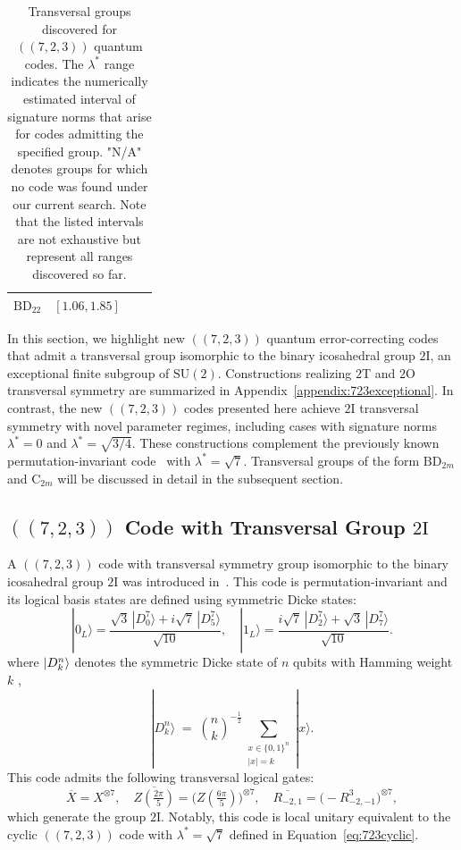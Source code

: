 \documentclass[8pt]{article}
\theoremstyle{definition}
\begin{document}
\begin{table}[h!]
\begin{tabular}{c | c || c | c}
        \(\mathrm{BD}_{22}\) & \([1.06, 1.85]\)                                  &                      &                                                                      \\
        \bottomrule
    \end{tabular}
    \caption{Transversal groups discovered for \(((7,2,3))\) quantum codes. The \(\lambda^*\) range indicates the numerically estimated interval of signature norms that arise for codes admitting the specified group. "N/A" denotes groups for which no code was found under our current search. Note that the listed intervals are not exhaustive but represent all ranges discovered so far.}
    \label{table:723-transversal-groups}
\end{table}

In this section, we highlight new \(((7,2,3))\) quantum error-correcting codes that admit a transversal group isomorphic to the binary icosahedral group \(2\mathrm{I}\), an exceptional finite subgroup of \(\mathrm{SU}(2)\). Constructions realizing \(2\mathrm{T}\) and \(2\mathrm{O}\) transversal symmetry are summarized in Appendix~\ref{appendix:723exceptional}. In contrast, the new \(((7,2,3))\) codes presented here achieve \(2\mathrm{I}\) transversal symmetry with novel parameter regimes, including cases with signature norms \(\lambda^* = 0\) and \(\lambda^* = \sqrt{3/4}\). These constructions complement the previously known permutation-invariant code~\cite{pollatsek2004permutationally,kubischta2023family} with \(\lambda^* = \sqrt{7}\). Transversal groups of the form \(\mathrm{BD}_{2m}\) and \(\mathrm{C}_{2m}\) will be discussed in detail in the subsequent section.

\subsection{\texorpdfstring{$((7,2,3))$}{((7,2,3))} Code with Transversal Group \texorpdfstring{$2\mathrm{I}$}{2I}}

A \(((7,2,3))\) code with transversal symmetry group isomorphic to the binary icosahedral group \(2\mathrm{I}\) was introduced in~\cite{kubischta2023family}. This code is permutation-invariant and its logical basis states are defined using symmetric Dicke states:
\[ |0_L\rangle = \frac{\sqrt{3}\,|D^7_0\rangle + i\sqrt{7}\,|D^7_5\rangle}{\sqrt{10}}, \quad
    |1_L\rangle = \frac{i\sqrt{7}\,|D^7_2\rangle + \sqrt{3}\,|D^7_7\rangle}{\sqrt{10}}. \]
where \(\ket{D^n_k}\) denotes the symmetric Dicke state of \(n\) qubits with Hamming weight \(k\) \cite{PhysRev.93.99},
\[ |D^n_k\rangle \;=\;\binom{n}{k}^{-\frac12} \sum_{\substack{x\in\{0,1\}^n\\|x|=k}}|x\rangle. \]
This code admits the following transversal logical gates:
\[ \overline{X} = X^{\otimes7},  \quad
    \overline{Z\left(\tfrac{2\pi}{5}\right)} = \bigl(Z(\tfrac{6\pi}{5})\bigr)^{\otimes7},  \quad
    \overline{R_{-2,1}} = \bigl(-R_{-2,-1}^{3}\bigr)^{\otimes7}, \]
which generate the group \(2\mathrm{I}\). Notably, this code is local unitary equivalent to the cyclic \(((7,2,3))\) code with \(\lambda^* = \sqrt{7}\) defined in Equation~\eqref{eq:723cyclic}.
\end{document}
